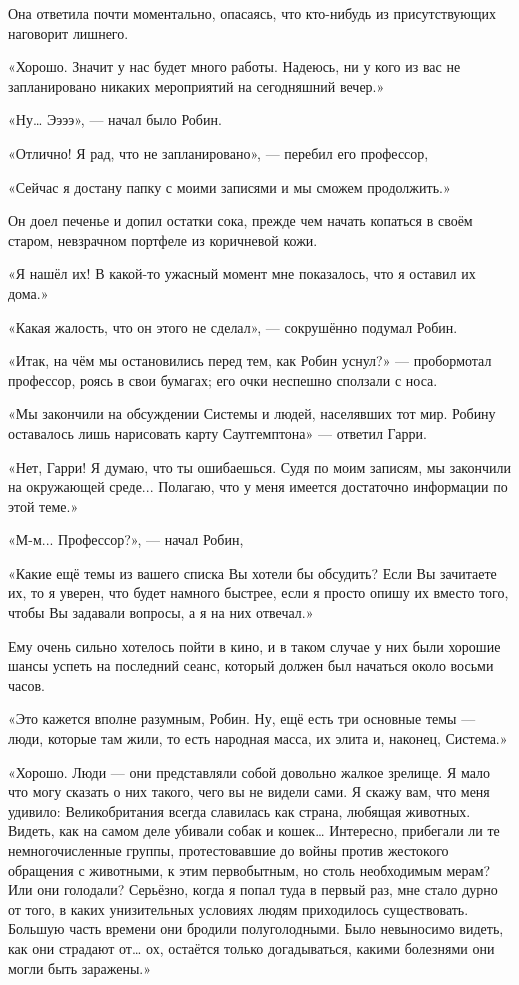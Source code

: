 \documentclass[a5paper, 9pt,
final, openany, twoside=true]{memoir}
\begin{document}
Она ответила почти моментально, опасаясь, что кто-нибудь из присутствующих наговорит лишнего.

«Хорошо. Значит у нас будет много работы. Надеюсь, ни у кого из вас не запланировано никаких мероприятий на сегодняшний вечер.»

«Ну… Ээээ», — начал было Робин.

«Отлично! Я рад, что не запланировано», — перебил его профессор,

«Сейчас я достану папку с моими записями и мы сможем продолжить.»

Он доел печенье и допил остатки сока, прежде чем начать копаться в своём старом, невзрачном портфеле из коричневой кожи.

«Я нашёл их! В какой-то ужасный момент мне показалось, что я оставил их дома.»

«Какая жалость, что он этого не сделал», — сокрушённо подумал Робин.

«Итак, на чём мы остановились перед тем, как Робин уснул?» — пробормотал профессор, роясь в свои бумагах; его очки неспешно сползали с носа.

«Мы закончили на обсуждении Системы и людей, населявших тот мир. Робину оставалось лишь нарисовать карту Саутгемптона» — ответил Гарри.

«Нет, Гарри! Я думаю, что ты ошибаешься. Судя по моим записям, мы закончили на окружающей среде... Полагаю, что у меня имеется достаточно информации по этой теме.»

«М-м... Профессор?», — начал Робин,

«Какие ещё темы из вашего списка Вы хотели бы обсудить? Если Вы зачитаете их, то я уверен, что будет намного быстрее, если я просто опишу их вместо того, чтобы Вы задавали вопросы, а я на них отвечал.»

Ему очень сильно хотелось пойти в кино, и в таком случае у них были хорошие шансы успеть на последний сеанс, который должен был начаться около восьми часов.

«Это кажется вполне разумным, Робин. Ну, ещё есть три основные темы — люди, которые там жили, то есть народная масса, их элита и, наконец, Система.»

«Хорошо. Люди — они представляли собой довольно жалкое зрелище. Я мало что могу сказать о них такого, чего вы не видели сами. Я скажу вам, что меня удивило: Великобритания всегда славилась как страна, любящая животных. Видеть, как на самом деле убивали собак и кошек… Интересно, прибегали ли те немногочисленные группы, протестовавшие до войны против жестокого обращения с животными, к этим первобытным, но столь необходимым мерам? Или они голодали? Серьёзно, когда я попал туда в первый раз, мне стало дурно от того, в каких унизительных условиях людям приходилось существовать. Большую часть времени они бродили полуголодными. Было невыносимо видеть, как они страдают от… ох, остаётся только догадываться, какими болезнями они могли быть заражены.»
\end{document}
